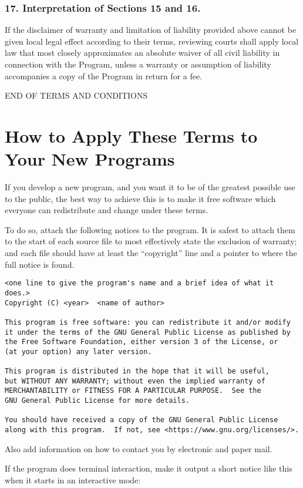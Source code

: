 \subsubsection{17. Interpretation of Sections 15 and 16.}
If the disclaimer of warranty and limitation of liability provided above cannot be given local legal effect according to their terms, reviewing courts shall apply local law that most closely approximates an absolute waiver of all civil liability in connection with the Program, unless a warranty or assumption of liability accompanies a copy of the Program in return for a fee.
\begin{center}END OF TERMS AND CONDITIONS\end{center}
\section{How to Apply These Terms to Your New Programs}
If you develop a new program, and you want it to be of the greatest possible use to the public, the best way to achieve this is to make it free software which everyone can redistribute and change under these terms.\par
To do so, attach the following notices to the program. It is safest to attach them to the start of each source file to most effectively state the exclusion of warranty; and each file should have at least the “copyright” line and a pointer to where the full notice is found.
\begin{verbatim}
<one line to give the program's name and a brief idea of what it does.>
Copyright (C) <year>  <name of author>

This program is free software: you can redistribute it and/or modify
it under the terms of the GNU General Public License as published by
the Free Software Foundation, either version 3 of the License, or
(at your option) any later version.

This program is distributed in the hope that it will be useful,
but WITHOUT ANY WARRANTY; without even the implied warranty of
MERCHANTABILITY or FITNESS FOR A PARTICULAR PURPOSE.  See the
GNU General Public License for more details.

You should have received a copy of the GNU General Public License
along with this program.  If not, see <https://www.gnu.org/licenses/>.
\end{verbatim}\par
Also add information on how to contact you by electronic and paper mail.\par
If the program does terminal interaction, make it output a short notice like this when it starts in an interactive mode:
